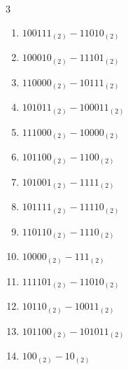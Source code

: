 \begin{multicols}{3}
\begin{enumerate}
  \item $100111_{(2)} - 11010_{(2)}$


  \item $100010_{(2)} - 11101_{(2)}$


  \item $110000_{(2)} - 10111_{(2)}$


  \item $101011_{(2)} - 100011_{(2)}$


  \item $111000_{(2)} - 10000_{(2)}$


  \item $101100_{(2)} - 1100_{(2)}$


  \item $101001_{(2)} - 1111_{(2)}$


\columnbreak %

\resetques

  \item $101111_{(2)} - 11110_{(2)}$


  \item $110110_{(2)} - 1110_{(2)}$


  \item $10000_{(2)} - 111_{(2)}$


  \item $111101_{(2)} - 11010_{(2)}$


  \item $10110_{(2)} - 10011_{(2)}$


  \item $101100_{(2)} - 101011_{(2)}$


  \item $100_{(2)} - 10_{(2)}$


\end{enumerate}
\end{multicols}
